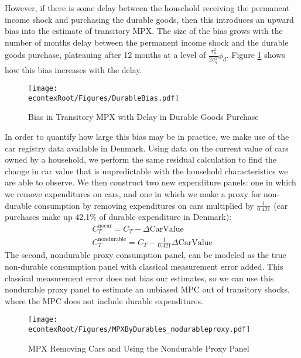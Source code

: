 \documentclass[titlepage]{\econtex}\newcommand{\texname}{ConsumptionHeterogeneity}
\begin{document}
However, if there is some delay between the household receiving the permanent income shock and purchasing the durable goods, then this introduces an upward bias into the estimate of transitory MPX. The size of the bias grows with the number of months delay between the permanent income shock and the durable goods purchase, plateauing after 12 months at a level of $\frac{\sigma^2_p}{2\sigma^2_q}\phi_d$. Figure \ref{fig:durable_bias} shows how this bias increases with the delay.
\begin{figure} 
	\begin{centering}
		\texttt{[image: \\econtexRoot/Figures/DurableBias.pdf]}
		\caption{Bias in Transitory MPX with Delay in Durable Goods Purchase}
		\label{fig:durable_bias}
	\end{centering}
\end{figure}

In order to quantify how large this bias may be in practice, we make use of the car registry data available in Denmark. Using data on the current value of cars owned by a household, we perform the same residual calculation to find the change in car value that is unpredictable with the household characteristics we are able to observe. We then construct two new expenditure panels: one in which we remove expenditures on cars, and one in which we make a proxy for non-durable consumption by removing expenditures on cars multiplied by $\frac{1}{0.421}$ (car purchases make up 42.1\% of durable expenditure in Denmark):
\begin{align*}
C_T^{\text{nocar}} = C_T - \Delta \text{CarValue} \\
C_T^{\text{nondurable}} = C_T - \frac{1}{0.421}\Delta \text{CarValue}
\end{align*}
The second, nondurable proxy consumption panel, can be modeled as the true non-durable consumption panel with classical measurement error added. This classical measurement error does not bias our estimates, so we can use this nondurable proxy panel to estimate an unbiased MPC out of transitory shocks, where the MPC does not include durable expenditures.
\begin{figure} 
	\begin{centering}
		\texttt{[image: \\econtexRoot/Figures/MPXByDurables\_nodurableproxy.pdf]}
		\caption{MPX Removing Cars and Using the Nondurable Proxy Panel}
		\label{fig:MPXByDurables}
	\end{centering}
\end{figure}
\end{document}
